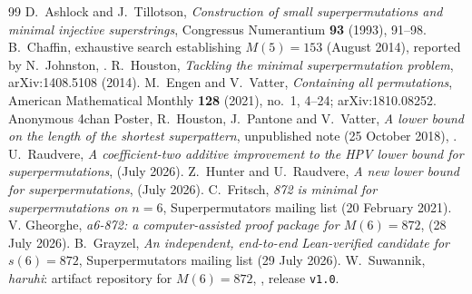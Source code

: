 \documentclass[10pt]{article}
\theoremstyle{remark}
\theoremstyle{plain}
\begin{document}
\begingroup\footnotesize
\begin{thebibliography}{99}
\setlength{\itemsep}{0pt}
\setlength{\parskip}{0pt}
 D.~Ashlock and J.~Tillotson,
\emph{Construction of small superpermutations and minimal injective
superstrings}, Congressus Numerantium \textbf{93} (1993), 91--98.
 B.~Chaffin, exhaustive search establishing $M(5)=153$
(August 2014), reported by N.~Johnston, .
 R.~Houston,
\emph{Tackling the minimal superpermutation problem},
arXiv:1408.5108 (2014).
 M.~Engen and V.~Vatter, \emph{Containing all
permutations}, American Mathematical Monthly \textbf{128} (2021),
no.~1, 4--24; arXiv:1810.08252.
 Anonymous 4chan Poster, R.~Houston, J.~Pantone and
V.~Vatter, \emph{A lower bound on the length of the shortest
superpattern}, unpublished note (25 October 2018),
.
 U.~Raudvere, \emph{A coefficient-two additive
improvement to the HPV lower bound for superpermutations},
 (July 2026).
 Z.~Hunter and U.~Raudvere, \emph{A new lower bound for
superpermutations}, 
(July 2026).
 C.~Fritsch, \emph{872 is minimal for
superpermutations on $n=6$}, Superpermutators mailing list
(20 February 2021).
 V. Gheorghe, \emph{a6-872: a computer-assisted proof
package for $M(6)=872$},  (28 July 2026).
 B.~Grayzel, \emph{An independent, end-to-end
Lean-verified candidate for $s(6)=872$}, Superpermutators mailing list
(29 July 2026).
 W.~Suwannik, \emph{haruhi}: artifact repository for
$M(6)=872$, , release \texttt{v1.0}.
\end{thebibliography}
\endgroup
\end{document}
